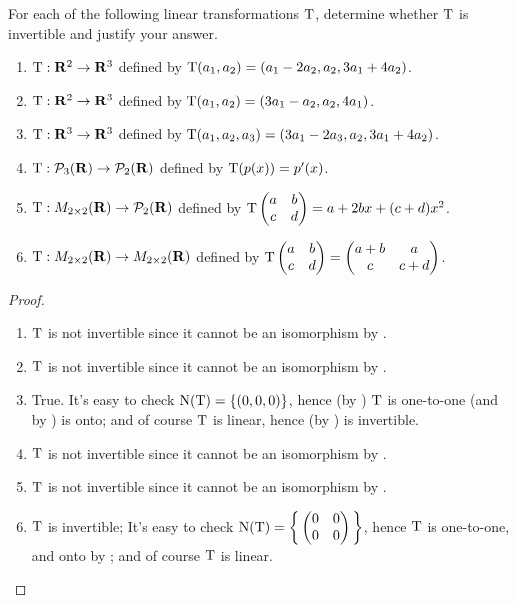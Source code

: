 \begin{exercise} \label{exercise 2.4.2}
For each of the following linear transformations \(\mathrm{T}\), determine whether \(\mathrm{T}\) is invertible and justify your answer.
\begin{enumerate}
\item \(\mathrm{T} : \mathbf{R}^2 \to \mathbf{R}^3\) defined by \(\mathrm{T}(a_1, a_2) = (a_1 - 2a_2, a_2, 3a_1 + 4a_2)\).
\item \(\mathrm{T} : \mathbf{R}^2 \to \mathbf{R}^3\) defined by \(\mathrm{T}(a_1, a_2) = (3a_1 - a_2, a_2, 4a_1)\).
\item \(\mathrm{T} : \mathbf{R}^3 \to \mathbf{R}^3\) defined by \(\mathrm{T}(a_1, a_2, a_3) = (3a_1 - 2a_3, a_2, 3a_1 + 4a_2)\).
\item \(\mathrm{T} : \mathcal{P}_3(\mathbf{R}) \to \mathcal{P}_2(\mathbf{R})\) defined by \(\mathrm{T}(p(x)) = p'(x)\).
\item \(\mathrm{T}: M_{2 \times 2}(\mathbf{R}) \to \mathcal{P}_2(\mathbf{R})\) defined by \(\mathrm{T} \begin{pmatrix} a & b \\ c & d \end{pmatrix} = a + 2bx + (c + d)x^2\).
\item \(\mathrm{T} : M_{2 \times 2}(\mathbf{R}) \to M_{2 \times 2}(\mathbf{R})\) defined by \(\mathrm{T} \begin{pmatrix} a & b \\ c & d \end{pmatrix} = \begin{pmatrix} a + b & a \\ c & c + d \end{pmatrix}\).
\end{enumerate}
\end{exercise}

\begin{proof} \ 

\begin{enumerate}
\item \(\mathrm{T}\) is not invertible since it cannot be an isomorphism by .
\item \(\mathrm{T}\) is not invertible since it cannot be an isomorphism by .
\item True.
    It's easy to check \(\mathrm{N(T)} = \{ (0, 0, 0) \}\), hence (by ) \(\mathrm{T}\) is one-to-one (and by ) is onto;
    and of course \(\mathrm{T}\) is linear, hence (by ) is invertible.
\item \(\mathrm{T}\) is not invertible since it cannot be an isomorphism by .
\item \(\mathrm{T}\) is not invertible since it cannot be an isomorphism by .
\item \(\mathrm{T}\) is invertible;
    It's easy to check \(\mathrm{N(T)} = \bigg\{ \begin{pmatrix} 0 & 0 \\ 0 & 0 \end{pmatrix} \bigg\}\), hence \(\mathrm{T}\) is one-to-one, and onto by ;
    and of course \(\mathrm{T}\) is linear.
\end{enumerate}
\end{proof}

